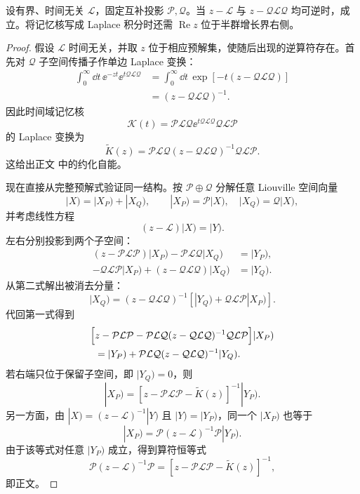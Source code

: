 \begin{lemma}
设有界、时间无关 $\mathcal L$，固定互补投影 $\mathcal P,\mathcal Q$。当 $z-\mathcal L$ 与 $z-\mathcal Q\mathcal L\mathcal Q$ 均可逆时，成立。将记忆核写成 Laplace 积分时还需 $\operatorname{Re}z$ 位于半群增长界右侧。
\end{lemma}
\begin{proof}
假设 $\mathcal L$ 时间无关，并取 $z$ 位于相应预解集，使随后出现的逆算符存在。首先对 $\mathcal Q$ 子空间传播子作单边 Laplace 变换：
\begin{align*}
\int_0^\infty\dd t\,\ee^{-zt}\ee^{t\mathcal Q\mathcal L\mathcal Q}
&=\int_0^\infty\dd t\,
\exp[-t(z-\mathcal Q\mathcal L\mathcal Q)]\\
&=(z-\mathcal Q\mathcal L\mathcal Q)^{-1}.
\end{align*}
因此时间域记忆核
\[
\mathcal K(t)=\mathcal P\mathcal L\mathcal Q
\ee^{t\mathcal Q\mathcal L\mathcal Q}
\mathcal Q\mathcal L\mathcal P
\]
的 Laplace 变换为
\[
\widetilde K(z)
=\mathcal P\mathcal L\mathcal Q
(z-\mathcal Q\mathcal L\mathcal Q)^{-1}
\mathcal Q\mathcal L\mathcal P.
\]
这给出正文 中的约化自能。

现在直接从完整预解式验证同一结构。按 $\mathcal P\oplus\mathcal Q$ 分解任意 Liouville 空间向量
\[
|X)=|X_P)+|X_Q),
\qquad
|X_P)=\mathcal P|X),\quad |X_Q)=\mathcal Q|X),
\]
并考虑线性方程
\[
(z-\mathcal L)|X)=|Y).
\]
左右分别投影到两个子空间：
\begin{align*}
(z-\mathcal P\mathcal L\mathcal P)|X_P)
-\mathcal P\mathcal L\mathcal Q|X_Q)
&=|Y_P),\\
-\mathcal Q\mathcal L\mathcal P|X_P)
+(z-\mathcal Q\mathcal L\mathcal Q)|X_Q)
&=|Y_Q).
\end{align*}
从第二式解出被消去分量：
\[
|X_Q)
=(z-\mathcal Q\mathcal L\mathcal Q)^{-1}
\left[|Y_Q)+\mathcal Q\mathcal L\mathcal P|X_P)\right].
\]
代回第一式得到
\begin{align*}
\Bigl[&z-\mathcal P\mathcal L\mathcal P
-\mathcal P\mathcal L\mathcal Q
(z-\mathcal Q\mathcal L\mathcal Q)^{-1}
\mathcal Q\mathcal L\mathcal P\Bigr]|X_P)\\
&=|Y_P)
+\mathcal P\mathcal L\mathcal Q
(z-\mathcal Q\mathcal L\mathcal Q)^{-1}|Y_Q).
\end{align*}
若右端只位于保留子空间，即 $|Y_Q)=0$，则
\[
|X_P)=
\left[z-\mathcal P\mathcal L\mathcal P-\widetilde K(z)\right]^{-1}|Y_P).
\]
另一方面，由 $|X)=(z-\mathcal L)^{-1}|Y)$ 且 $|Y)=|Y_P)$，同一个 $|X_P)$ 也等于
\[
|X_P)=\mathcal P(z-\mathcal L)^{-1}\mathcal P|Y_P).
\]
由于该等式对任意 $|Y_P)$ 成立，得到算符恒等式
\[
\mathcal P(z-\mathcal L)^{-1}\mathcal P
=\left[z-\mathcal P\mathcal L\mathcal P-\widetilde K(z)\right]^{-1},
\]
即正文。
\end{proof}


